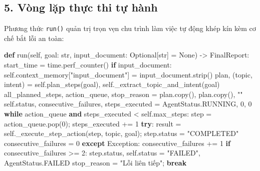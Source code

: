 \documentclass[]{article}
\newenvironment{Shaded}{}{}
\newcommand{\BuiltInTok}[1]{#1}
\newcommand{\ControlFlowTok}[1]{\textcolor[rgb]{0.00,0.44,0.13}{\textbf{#1}}}
\newcommand{\DecValTok}[1]{\textcolor[rgb]{0.25,0.63,0.44}{#1}}
\newcommand{\KeywordTok}[1]{\textcolor[rgb]{0.00,0.44,0.13}{\textbf{#1}}}
\newcommand{\NormalTok}[1]{#1}
\newcommand{\OperatorTok}[1]{\textcolor[rgb]{0.40,0.40,0.40}{#1}}
\newcommand{\PreprocessorTok}[1]{\textcolor[rgb]{0.74,0.48,0.00}{#1}}
\newcommand{\StringTok}[1]{\textcolor[rgb]{0.25,0.44,0.63}{#1}}
\newcommand{\VariableTok}[1]{\textcolor[rgb]{0.10,0.09,0.49}{#1}}
\begin{document}
\newpage
\subsection{5. Vòng lặp thực thi tự hành}
Phương thức \texttt{run()} quản trị trọn vẹn chu trình làm việc tự động khép kín kèm cơ chế bắt lỗi an toàn:

\begin{Shaded}
\begin{Highlighting}[fontsize=\scriptsize]
    \KeywordTok{def}\NormalTok{ run(}\VariableTok{self}\NormalTok{, goal: }\BuiltInTok{str}\NormalTok{, input_document: Optional[}\BuiltInTok{str}\NormalTok{] }\OperatorTok{=} \VariableTok{None}\NormalTok{) }\OperatorTok{->}\NormalTok{ FinalReport:}
\NormalTok{        start_time }\OperatorTok{=}\NormalTok{ time.perf_counter()}
        \ControlFlowTok{if}\NormalTok{ input_document: }\VariableTok{self}\NormalTok{.context_memory[}\StringTok{"input_document"}\NormalTok{] }\OperatorTok{=}\NormalTok{ input_document.strip()}
\NormalTok{        plan, (topic, intent) }\OperatorTok{=} \VariableTok{self}\NormalTok{.plan_steps(goal), }\VariableTok{self}\NormalTok{._extract_topic_and_intent(goal)}
\NormalTok{        all_planned_steps, action_queue, stop_reason }\OperatorTok{=}\NormalTok{ plan.copy(), plan.copy(), }\StringTok{""}
\NormalTok{        }\VariableTok{self}\NormalTok{.status, consecutive_failures, steps_executed }\OperatorTok{=}\NormalTok{ AgentStatus.RUNNING, }\DecValTok{0}\NormalTok{, }\DecValTok{0}
        \ControlFlowTok{while}\NormalTok{ action_queue }\KeywordTok{and}\NormalTok{ steps_executed }\OperatorTok{<} \VariableTok{self}\NormalTok{.max_steps:}
\NormalTok{            step }\OperatorTok{=}\NormalTok{ action_queue.pop(}\DecValTok{0}\NormalTok{)}\OperatorTok{;}\NormalTok{ steps_executed }\OperatorTok{+=} \DecValTok{1}
            \ControlFlowTok{try}\NormalTok{:}
\NormalTok{                result }\OperatorTok{=} \VariableTok{self}\NormalTok{._execute_step_action(step, topic, goal)}\OperatorTok{;}\NormalTok{ step.status }\OperatorTok{=} \StringTok{"COMPLETED"}
\NormalTok{                consecutive_failures }\OperatorTok{=} \DecValTok{0}
            \ControlFlowTok{except} \PreprocessorTok{Exception}\NormalTok{:}
\NormalTok{                consecutive_failures }\OperatorTok{+=} \DecValTok{1}
                \ControlFlowTok{if}\NormalTok{ consecutive_failures }\OperatorTok{>=} \DecValTok{2}\NormalTok{:}
\NormalTok{                    step.status, }\VariableTok{self}\NormalTok{.status }\OperatorTok{=} \StringTok{"FAILED"}\NormalTok{, AgentStatus.FAILED}
\NormalTok{                    stop_reason }\OperatorTok{=} \StringTok{"Lỗi liên tiếp"}\OperatorTok{;} \ControlFlowTok{break}

\end{Highlighting}
\end{Shaded}
\end{document}
